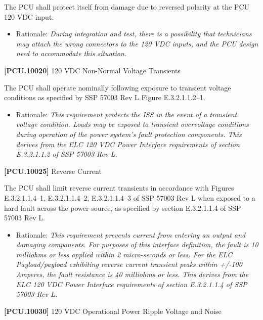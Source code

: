 \documentclass[12pt,oneside,oldfontcommands]{memoir}
\begin{document}
The \gls{PCU} shall protect itself from damage due to reversed polarity at the \gls{PCU} 120 \gls{VDC} input.

\begin{itemize}
\item{} Rationale: \emph{During integration and test, there is a possibility that technicians may attach the wrong connectors to the 120 VDC inputs, and the PCU design need to accommodate this situation.}

\end{itemize}

\textbf{[PCU.10020]} 120 \gls{VDC} Non-Normal Voltage Transients

The \gls{PCU} shall operate nominally following exposure to transient voltage conditions as specified by SSP 57003 Rev L Figure E.3.2.1.1.2--1.

\begin{itemize}
\item{} Rationale: \emph{This requirement protects the ISS in the event of a transient voltage condition. Loads may be exposed to transient overvoltage conditions during operation of the power system's fault protection components. This derives from the ELC 120 VDC Power Interface requirements of section E.3.2.1.1.2 of SSP 57003 Rev L.}

\end{itemize}

\textbf{[PCU.10025]} Reverse Current

The \gls{PCU} shall limit reverse current transients in accordance with Figures E.3.2.1.1.4--1, E.3.2.1.1.4--2, E.3.2.1.1.4--3 of SSP 57003 Rev L when exposed to a hard fault across the power source, as specified by section E.3.2.1.1.4 of SSP 57003 Rev L.

\begin{itemize}
\item{} Rationale: \emph{This requirement prevents current from entering an output and damaging components. For purposes of this interface definition, the fault is 10 milliohms or less applied within 2 micro-seconds or less. For the ELC Payload\slash payload exhibiting reverse current transient peaks within +\slash -100 Amperes, the fault resistance is 40 milliohms or less. This derives from the ELC 120 VDC Power Interface requirements of section E.3.2.1.1.4 of SSP 57003 Rev L.}

\end{itemize}

\textbf{[PCU.10030]} 120 \gls{VDC} Operational Power Ripple Voltage and Noise
\end{document}
